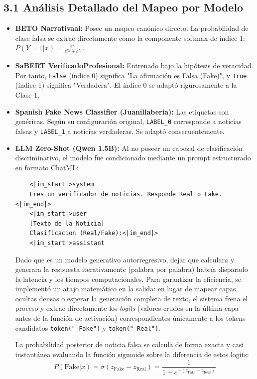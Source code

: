 \subsection*{3.1 Análisis Detallado del Mapeo por Modelo}

\begin{itemize}
    \item \textbf{BETO Narrativaai:} Posee un mapeo canónico directo. La probabilidad de clase falsa se extrae directamente como la componente softmax de índice 1: $P(Y=1|x) = \frac{e^{z_1}}{e^{z_0} + e^{z_1}}$.
    \item \textbf{SaBERT VerificadoProfesional:} Entrenado bajo la hipótesis de veracidad. Por tanto, \texttt{False} (índice 0) significa "La afirmación es Falsa (Fake)", y \texttt{True} (índice 1) significa "Verdadera". El índice 0 se adaptó rigurosamente a la Clase 1.
    \item \textbf{Spanish Fake News Classifier (Juanillaberia):} Las etiquetas son genéricas. Según su configuración original, \texttt{LABEL\_0} corresponde a noticias falsas y \texttt{LABEL\_1} a noticias verdaderas. Se adaptó consecuentemente.
    \item \textbf{LLM Zero-Shot (Qwen 1.5B):} Al no poseer un cabezal de clasificación discriminativo, el modelo fue condicionado mediante un prompt estructurado en formato ChatML:
    \begin{verbatim}
    <|im_start|>system
    Eres un verificador de noticias. Responde Real o Fake.<|im_end|>
    <|im_start|>user
    [Texto de la Noticia]
    Clasificacion (Real/Fake):<|im_end|>
    <|im_start|>assistant
    \end{verbatim}
    Dado que es un modelo generativo autorregresivo, dejar que calculara y generara la respuesta iterativamente (palabra por palabra) habría disparado la latencia y los tiempos computacionales. Para garantizar la eficiencia, se implementó un atajo matemático en la salida: en lugar de mapear capas ocultas densas o esperar la generación completa de texto, el sistema frena el proceso y extrae directamente los \textit{logits} (valores crudos en la última capa antes de la función de activación) correspondientes únicamente a los tokens candidatos \texttt{token(" Fake")} y \texttt{token(" Real")}. 
    
    La probabilidad posterior de noticia falsa se calcula de forma exacta y casi instantánea evaluando la función sigmoide sobre la diferencia de estos logits:
    \begin{equation}
    P(\text{Fake}|x) = \sigma(z_{\text{Fake}} - z_{\text{Real}}) = \frac{1}{1 + e^{-(z_{\text{Fake}} - z_{\text{Real}})}}
    \end{equation}
    

\end{itemize}
